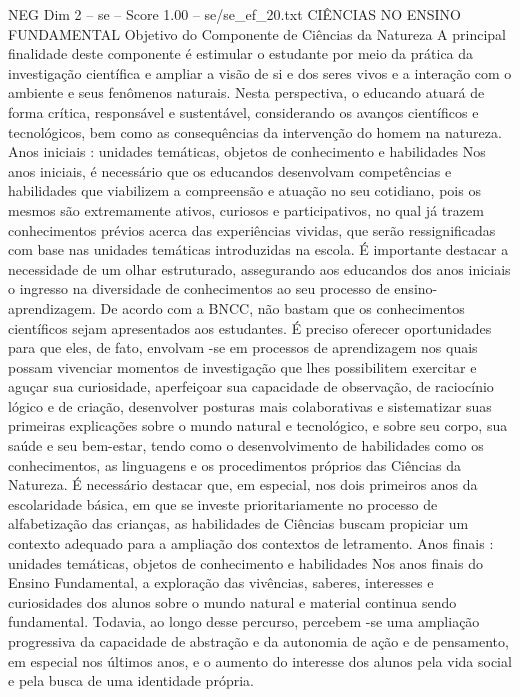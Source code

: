 \begin{textsample}{NEG Dim 2 – se – Score 1.00 – se/se\_ef\_20.txt}  \label{ex:f2_neg_263}
CIÊNCIAS NO ENSINO FUNDAMENTAL Objetivo do Componente de Ciências da Natureza A principal finalidade deste componente é estimular o estudante por meio da prática da investigação científica e ampliar a visão de si e dos seres vivos e a interação com o ambiente e seus fenômenos naturais.
Nesta perspectiva, o educando atuará de forma crítica, responsável e sustentável, considerando os avanços científicos e tecnológicos, bem como as consequências da intervenção do homem na natureza.
Anos iniciais : unidades temáticas, objetos de conhecimento e habilidades Nos anos iniciais, é necessário que os educandos desenvolvam competências e habilidades que viabilizem a compreensão e atuação no seu cotidiano, pois os mesmos são extremamente ativos, curiosos e participativos, no qual já trazem conhecimentos prévios acerca das experiências vividas, que serão ressignificadas com base nas unidades temáticas introduzidas na escola.
É importante destacar a necessidade de um olhar estruturado, assegurando aos educandos dos anos iniciais o ingresso na diversidade de conhecimentos ao seu processo de ensino-aprendizagem.
De acordo com a BNCC, não bastam que os conhecimentos científicos sejam apresentados aos estudantes.
É preciso oferecer oportunidades para que eles, de fato, envolvam -se em processos de aprendizagem nos quais possam vivenciar momentos de investigação que lhes possibilitem exercitar e aguçar sua curiosidade, aperfeiçoar sua capacidade de observação, de raciocínio lógico e de criação, desenvolver posturas mais colaborativas e sistematizar suas primeiras explicações sobre o mundo natural e tecnológico, e sobre seu corpo, sua saúde e seu bem-estar, tendo como o desenvolvimento de habilidades como os conhecimentos, as linguagens e os procedimentos próprios das Ciências da Natureza.
É necessário destacar que, em especial, nos dois primeiros anos da escolaridade básica, em que se investe prioritariamente no processo de alfabetização das crianças, as habilidades de Ciências buscam propiciar um contexto adequado para a ampliação dos contextos de letramento.
Anos finais : unidades temáticas, objetos de conhecimento e habilidades Nos anos finais do Ensino Fundamental, a exploração das vivências, saberes, interesses e curiosidades dos alunos sobre o mundo natural e material continua sendo fundamental.
Todavia, ao longo desse percurso, percebem -se uma ampliação progressiva da capacidade de abstração e da autonomia de ação e de pensamento, em especial nos últimos anos, e o aumento do interesse dos alunos pela vida social e pela busca de uma identidade própria.

\end{textsample}
